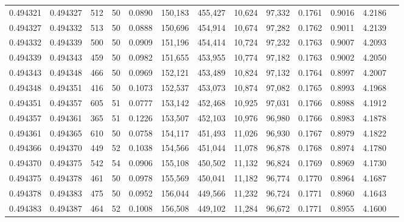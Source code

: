 \begin{tabular}{rrrrrrrrrrrrr}
0.494321 & 0.494327 &   512 &  50 &                                     0.0890 & 150,183 & 455,427 &  10,624 &  97,332 & 0.1761 & 0.9016 & 4.2186 \\
0.494327 & 0.494332 &   513 &  50 &                                     0.0888 & 150,696 & 454,914 &  10,674 &  97,282 & 0.1762 & 0.9011 & 4.2139 \\
0.494332 & 0.494339 &   500 &  50 &                                     0.0909 & 151,196 & 454,414 &  10,724 &  97,232 & 0.1763 & 0.9007 & 4.2093 \\
0.494339 & 0.494343 &   459 &  50 &                                     0.0982 & 151,655 & 453,955 &  10,774 &  97,182 & 0.1763 & 0.9002 & 4.2050 \\
0.494343 & 0.494348 &   466 &  50 &                                     0.0969 & 152,121 & 453,489 &  10,824 &  97,132 & 0.1764 & 0.8997 & 4.2007 \\
0.494348 & 0.494351 &   416 &  50 &                                     0.1073 & 152,537 & 453,073 &  10,874 &  97,082 & 0.1765 & 0.8993 & 4.1968 \\
0.494351 & 0.494357 &   605 &  51 &                                     0.0777 & 153,142 & 452,468 &  10,925 &  97,031 & 0.1766 & 0.8988 & 4.1912 \\
0.494357 & 0.494361 &   365 &  51 &                                     0.1226 & 153,507 & 452,103 &  10,976 &  96,980 & 0.1766 & 0.8983 & 4.1878 \\
0.494361 & 0.494365 &   610 &  50 &                                     0.0758 & 154,117 & 451,493 &  11,026 &  96,930 & 0.1767 & 0.8979 & 4.1822 \\
0.494366 & 0.494370 &   449 &  52 &                                     0.1038 & 154,566 & 451,044 &  11,078 &  96,878 & 0.1768 & 0.8974 & 4.1780 \\
0.494370 & 0.494375 &   542 &  54 &                                     0.0906 & 155,108 & 450,502 &  11,132 &  96,824 & 0.1769 & 0.8969 & 4.1730 \\
0.494375 & 0.494378 &   461 &  50 &                                     0.0978 & 155,569 & 450,041 &  11,182 &  96,774 & 0.1770 & 0.8964 & 4.1687 \\
0.494378 & 0.494383 &   475 &  50 &                                     0.0952 & 156,044 & 449,566 &  11,232 &  96,724 & 0.1771 & 0.8960 & 4.1643 \\
0.494383 & 0.494387 &   464 &  52 &                                     0.1008 & 156,508 & 449,102 &  11,284 &  96,672 & 0.1771 & 0.8955 & 4.1600 \\

\end{tabular}
